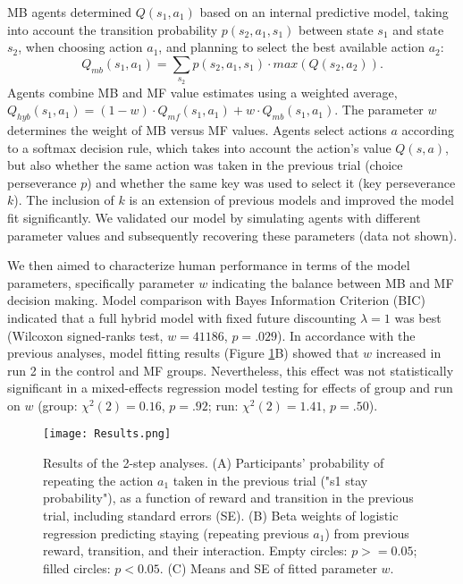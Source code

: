 \documentclass[11pt]{article} %
\begin{document}
MB agents determined $Q(s_{1}, a_{1})$ based on an internal predictive model, taking into account the transition probability $p(s_{2}, a_{1}, s_{1})$ between state $s_{1}$ and state $s_{2}$, when choosing action $a_{1}$, and planning to select the best available action $a_{2}$:
%
\begin{equation}
Q_{mb}(s_{1}, a_{1}) = \sum_{s_{2}} p(s_{2}, a_{1}, s_{1}) \cdot max(Q(s_{2}, a_{2})).
\end{equation}
%
Agents combine MB and MF value estimates using a weighted average, $Q_{hyb}(s_{1}, a_{1}) = (1 - w) \cdot Q_{mf}(s_{1}, a_{1}) + w \cdot Q_{mb}(s_{1}, a_{1})$. The parameter $w$ determines the weight of MB versus MF values. Agents select actions $a$ according to a softmax decision rule, which takes into account the action's value $Q(s, a)$, but also whether the same action was taken in the previous trial (choice perseverance $p$) and whether the same key was used to select it (key perseverance $k$). The inclusion of $k$ is an extension of previous models and improved the model fit significantly. We validated our model by simulating agents with different parameter values and subsequently recovering these parameters (data not shown).

We then aimed to characterize human performance in terms of the model parameters, specifically parameter $w$ indicating the balance between MB and MF decision making. Model comparison with Bayes Information Criterion (BIC) indicated that a full hybrid model with fixed future discounting $\lambda=1$ was best (Wilcoxon signed-ranks test, $w = 41186$, $p = .029$). In accordance with the previous analyses, model fitting results (Figure \ref{Results}B) showed that $w$ increased in run 2 in the control and MF groups. Nevertheless, this effect was not statistically significant in a mixed-effects regression model testing for effects of group and run on $w$ (group: $\chi^{2}(2)=0.16$, $p = .92$; run: $\chi^{2}(2)=1.41$, $p = .50$).
%
\begin{figure}
	\texttt{[image: Results.png]}
	\caption{Results of the 2-step analyses. (A) Participants' probability of repeating the action $a_{1}$ taken in the previous trial ("s1 stay probability"), as a function of reward and transition in the previous trial, including standard errors (SE). (B) Beta weights of logistic regression predicting staying (repeating previous $a_{1}$) from previous reward, transition, and their interaction. Empty circles: $p >= 0.05$; filled circles: $p < 0.05$. (C) Means and SE of fitted parameter $w$.}
	\label{Results}
\end{figure}
%
\end{document}
